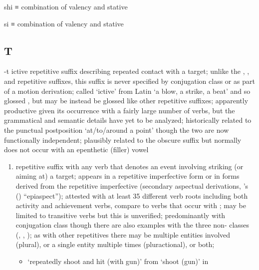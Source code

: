\begin{morphdesc}[resume*=alphalist]
\item[shi]
	≡ 
	combination of valency 
		and stative 

\item[si]
	≡ 
	combination of valency 
		and stative 
\end{morphdesc}

\subsection{T}\label{sec:alphalist-t}
\begin{morphdesc}[resume*=alphalist]
\item[-t]\label{m:-t}
	ictive repetitive suffix describing repeated contact with a target;
	unlike the , , and  repetitive suffixes,
		this suffix is never specified by conjugation class
		or as part of a motion derivation;
	called ‘ictive’ from Latin  ‘a blow, a strike, a beat’
		and so glossed ,
		but may be instead be glossed  like other repetitive suffixes;
	apparently productive given its occurrence with a fairly large number of verbs,
		but the grammatical and semantic details have yet to be analyzed;
	historically related to the punctual postposition  ‘at/to/around a point’
		though the two are now functionally independent;
	plausibly related to the obscure suffix  but  normally does not occur
		with an epenthetic (filler) vowel
	\begin{enumerate}
	\item	repetitive suffix with any verb that denotes an event involving
			striking (or aiming at) a target;
		appears in a repetitive imperfective form
			or in forms derived from the repetitive imperfective
			(secondary aspectual derivations, 
			\citeauthor{leer:1991}’s (\citeyear{leer:1991}) “epiaspect”);
		attested with at least 35 different verb roots
			including both activity and achievement verbs,
			compare to verbs that occur with ;
		may be limited to transitive verbs but this is unverified;
		predominantly with  conjugation class though there are also examples
			with the three non- classes (, , );
		as with other repetitives there may be multiple entities involved (plural),
			or a single entity multiple times (pluractional),
			or both;
		\begin{itemize}
		\item	{} ‘repeatedly shoot and hit (with gun)’
			from  ‘shoot (gun)’ in

\end{itemize}
\end{enumerate}
\end{morphdesc}
